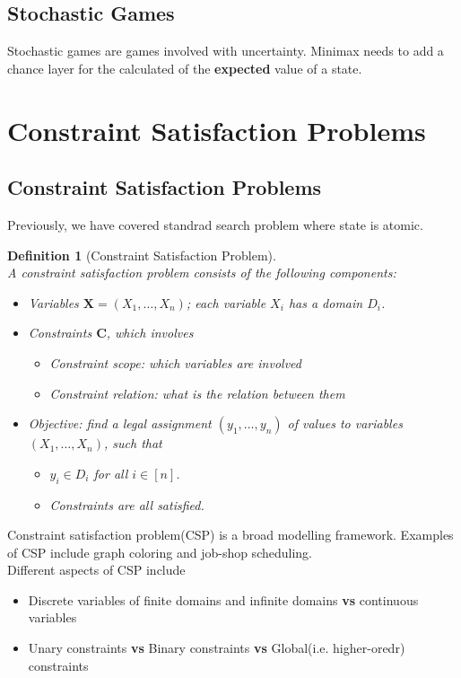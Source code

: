 \documentclass[12pt]{article}
\newtheorem{definition}{Definition}[section]
\theoremstyle{definition}
\begin{document}
\subsection{Stochastic Games}
Stochastic games are games involved with uncertainty. Minimax needs to add a chance layer for the calculated of the \textbf{expected} value of a state.
\clearpage
\section{Constraint Satisfaction Problems}
\subsection{Constraint Satisfaction Problems}
Previously, we have covered standrad search problem where state is atomic.
\begin{definition}[Constraint Satisfaction Problem]
\hfill\\\normalfont A constraint satisfaction problem consists of the following components:
\begin{itemize}
\item Variables $\mathbf{X}=(X_1,\ldots, X_n)$; each variable $X_i$ has a domain $D_i$.
\item Constraints $\mathbf{C}$, which involves
\begin{itemize}
	\item Constraint scope: which variables are involved
	\item Constraint relation: what is the relation between them
\end{itemize}
\item Objective: find a legal assignment $(y_1,\ldots, y_n)$ of values to variables $(X_1,\ldots, X_n)$, such that
\begin{itemize}
	\item $y_i\in D_i$ for all $i\in[n]$.
	\item Constraints are all satisfied.
\end{itemize}
\end{itemize}
\end{definition}
Constraint satisfaction problem(CSP) is a broad modelling framework. Examples of CSP include graph coloring and job-shop scheduling.\\
Different aspects of CSP include
\begin{itemize}
\item Discrete variables of finite domains and infinite domains \textbf{vs} continuous variables
\item Unary constraints \textbf{vs} Binary constraints \textbf{vs} Global(i.e. higher-oredr) constraints
\end{itemize} 
\end{document}
